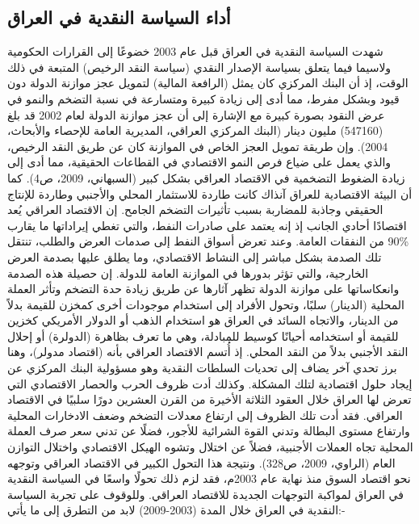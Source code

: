 \documentclass[10pt,a4paper]{report}
\begin{document}
\begin{doublespacing}
\subsection{أداء السياسة النقدية في العراق}
شهدت السياسة النقدية في العراق قبل عام 2003 خضوعًا إلى القرارات الحكومية ولاسيما فيما يتعلق بسياسة الإصدار النقدي (سياسة النقد الرخيص) المتبعة في ذلك الوقت، إذ أن البنك المركزي كان يمثل (الرافعة المالية) لتمويل عجز موازنة الدولة دون قيود وبشكل مفرط، مما أدى إلى زيادة كبيرة ومتسارعة في نسبة التضخم والنمو في عرض النقود بصورة كبيرة مع الإشارة إلى أن عجز موازنة الدولة لعام 2002 قد بلغ (547160) مليون دينار ({البنك المركزي العراقي، المديرية العامة للإحصاء والأبحاث، 2004}). وإن طريقة تمويل العجز الخاص في الموازنة كان عن طريق النقد الرخيص، والذي يعمل على ضياع فرص النمو الاقتصادي في القطاعات الحقيقية، مما أدى إلى زيادة الضغوط التضخمية في الاقتصاد العراقي بشكل كبير ({السبهاني، 2009، ص4}). كما أن البيئة الاقتصادية للعراق آنذاك كانت طاردة للاستثمار المحلي والأجنبي وطاردة للإنتاج الحقيقي وجاذبة للمضاربة بسبب تأثيرات التضخم الجامح.
إن الاقتصاد العراقي يُعد اقتصادًا أحادي الجانب إذ إنه يعتمد على صادرات النفط، والتي تغطي إيراداتها ما يقارب \%90 من النفقات العامة. وعند تعرض أسواق النفط إلى صدمات العرض والطلب، تنتقل تلك الصدمة بشكل مباشر إلى النشاط الاقتصادي، وما يطلق عليها بصدمة العرض الخارجية، والتي تؤثر بدورها في الموازنة العامة للدولة. إن حصيلة هذه الصدمة وانعكاساتها على موازنة الدولة تظهر آثارها عن طريق زيادة حدة التضخم وتأثر العملة المحلية (الدينار) سلبًا، وتحول الأفراد إلى استخدام موجودات أخرى كمخزن للقيمة بدلاً من الدينار، والاتجاه السائد في العراق هو استخدام الذهب أو الدولار الأمريكي كخزين للقيمة أو استخدامه أحيانًا كوسيط للمبادلة، وهي ما تعرف بظاهرة (الدولرة) أو إحلال النقد الأجنبي بدلاً من النقد المحلي. إذ أُتسم الاقتصاد العراقي بأنه (اقتصاد مدولر)، وهنا برز تحدي آخر يضاف إلى تحديات السلطات النقدية وهو مسؤولية البنك المركزي عن إيجاد حلول اقتصادية لتلك المشكلة. وكذلك أدت ظروف الحرب والحصار الاقتصادي التي تعرض لها العراق خلال العقود الثلاثة الأخيرة من القرن العشرين دورًا سلبيًا في الاقتصاد العراقي. فقد أدت تلك الظروف إلى ارتفاع معدلات التضخم وضعف الادخارات المحلية وارتفاع مستوى البطالة وتدني القوة الشرائية للأجور، فضلًا عن تدني سعر صرف العملة المحلية تجاه العملات الأجنبية، فضلاً عن اختلال وتشوه الهيكل الاقتصادي واختلال التوازن العام ({الراوي، 2009، ص328}). ونتيجة هذا التحول الكبير في الاقتصاد العراقي وتوجهه نحو اقتصاد السوق منذ نهاية عام 2003م، فقد لزم ذلك تحولًا واسعًا في السياسة النقدية في العراق لمواكبة التوجهات الجديدة للاقتصاد العراقي. وللوقوف على تجربة السياسة النقدية في العراق خلال المدة (2003-2009) لابد من التطرق إلى ما يأتي:-

\end{doublespacing}
\end{document}
